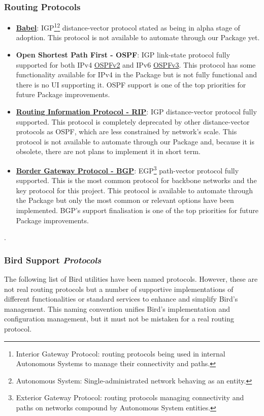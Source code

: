 \subsubsection{Routing Protocols}
\begin{itemize}
    \item \textbf{\href{https://www.irif.fr/~jch//software/babel/}{Babel}}: IGP\footnote{Interior Gateway Protocol: routing protocols being used in internal Autonomous Systems to manage their connectivity and paths.}\footnote{Autonomous System: Single-administrated network behaving as an entity.} distance-vector protocol stated as being in alpha stage of adoption.
    This protocol is not available to automate through our Package yet.
    \item \textbf{Open Shortest Path First - OSPF}: IGP link-state protocol fully supported for both IPv4 \href{https://tools.ietf.org/html/rfc2328}{OSPFv2} and IPv6 \href{https://tools.ietf.org/html/rfc5340}{OSPFv3}.
    This protocol has some functionality available for IPv4 in the Package but is not fully functional and there is no UI supporting it. OSPF support is one of the top priorities for future Package improvements.
    \item \textbf{\href{https://www.rfc-editor.org/rfc/rfc2453.txt}{Routing Information Protocol - RIP}}: IGP distance-vector protocol fully supported. This protocol is completely deprecated by other distance-vector protocols as OSPF, which are less constrained by network's scale.
    This protocol is not available to automate through our Package and, because it is obsolete, there are not plans to implement it in short term.
    \item \textbf{\href{https://www.rfc-editor.org/rfc/rfc4271.txt}{Border Gateway Protocol - BGP}}: EGP\footnote{Exterior Gateway Protocol: routing protocols managing connectivity and paths on networks compound by Autonomous System entities.} path-vector protocol fully supported. This is the most common protocol for backbone networks and the key protocol for this project.
    This protocol is available to automate through the Package but only the most common or relevant options have been implemented. BGP's support finalisation is one of the top priorities for future Package improvements. 
\end{itemize}.

\subsubsection{Bird Support \textit{Protocols}}
\label{sub:sub:supproto}
The following list of Bird utilities have been named protocols. However, these are not real routing protocols but a number of supportive implementations of different functionalities or standard services to enhance and simplify Bird's management. This naming convention unifies Bird's implementation and configuration management, but it must not be mistaken for a real routing protocol.

